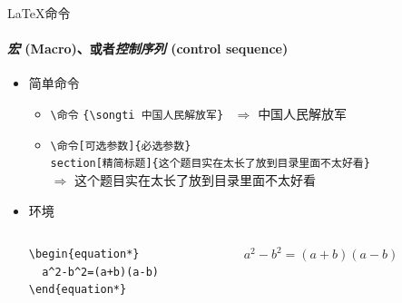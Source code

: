 \begin{frame}[fragile]{\LaTeX{}命令}
  \framesubtitle{\emph{宏} (Macro)、或者\emph{控制序列} (control sequence)}
\begin{itemize}
\item 简单命令
  \begin{itemize}
    \item \verb|\命令|\hspace{2em}
    \verb|{\songti 中国人民解放军}| ~$\Rightarrow$ {\songti 中国人民解放军}
  \item \verb|\命令[可选参数]{必选参数}|\\
\verb|section[精简标题]{这个题目实在太长了放到目录里面不太好看}|\\
$\Rightarrow$ { \hspace{1em} \songti 这个题目实在太长了放到目录里面不太好看}
  \end{itemize}
\item 环境
  \begin{columns}[c]
  \begin{column}{0.45\textwidth}
\begin{verbatim}
\begin{equation*}
  a^2-b^2=(a+b)(a-b)
\end{equation*}
\end{verbatim}
\end{column}\hspace{1em}
  \begin{column}{0.45\textwidth}
$ a^2-b^2=(a+b)(a-b)$
\end{column}
  \end{columns}
\end{itemize}
\end{frame}

